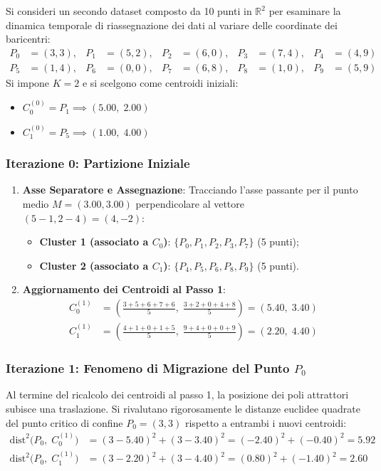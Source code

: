Si consideri un secondo dataset composto da 10 punti in $\mathbb{R}^2$ per esaminare la dinamica temporale di riassegnazione dei dati al variare delle coordinate dei baricentri:
\begin{align}
P_0 &= (3, 3), & P_1 &= (5, 2), & P_2 &= (6, 0), & P_3 &= (7, 4), & P_4 &= (4, 9) \nonumber \\
P_5 &= (1, 4), & P_6 &= (0, 0), & P_7 &= (6, 8), & P_8 &= (1, 0), & P_9 &= (5, 9)
\end{align}
Si impone $K = 2$ e si scelgono come centroidi iniziali:
\begin{itemize}
    \item $C_0^{(0)} = P_1 \implies (5.00, \; 2.00)$
    \item $C_1^{(0)} = P_5 \implies (1.00, \; 4.00)$
\end{itemize}

\FloatBarrier
\subsubsection{Iterazione 0: Partizione Iniziale}
\begin{enumerate}[label=\textbf{\arabic*.}]
    \item \textbf{Asse Separatore e Assegnazione}:
    Tracciando l'asse passante per il punto medio $M = (3.00, 3.00)$ perpendicolare al vettore $(5 - 1, 2 - 4) = (4, -2)$:
    \begin{itemize}
        \item \textbf{Cluster 1 (associato a $C_0$)}: $\{P_0, P_1, P_2, P_3, P_7\}$ (5 punti);
        \item \textbf{Cluster 2 (associato a $C_1$)}: $\{P_4, P_5, P_6, P_8, P_9\}$ (5 punti).
    \end{itemize}
    \item \textbf{Aggiornamento dei Centroidi al Passo 1}:
    \begin{align}
    C_0^{(1)} &= \left( \frac{3 + 5 + 6 + 7 + 6}{5}, \; \frac{3 + 2 + 0 + 4 + 8}{5} \right) = (5.40, \; 3.40) \\[4pt]
    C_1^{(1)} &= \left( \frac{4 + 1 + 0 + 1 + 5}{5}, \; \frac{9 + 4 + 0 + 0 + 9}{5} \right) = (2.20, \; 4.40)
    \end{align}
\end{enumerate}

\FloatBarrier
\subsubsection{Iterazione 1: Fenomeno di Migrazione del Punto $P_0$}
Al termine del ricalcolo dei centroidi al passo 1, la posizione dei poli attrattori subisce una traslazione. Si rivalutano rigorosamente le distanze euclidee quadrate del punto critico di confine $P_0 = (3, 3)$ rispetto a entrambi i nuovi centroidi:
\begin{align}
\mathrm{dist}^2\big(P_0, \; C_0^{(1)}\big) &= (3 - 5.40)^2 + (3 - 3.40)^2 = (-2.40)^2 + (-0.40)^2 = \mathbf{5.92} \\[4pt]
\mathrm{dist}^2\big(P_0, \; C_1^{(1)}\big) &= (3 - 2.20)^2 + (3 - 4.40)^2 = (0.80)^2 + (-1.40)^2 = \mathbf{2.60}
\end{align}

